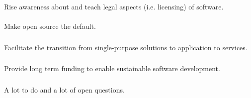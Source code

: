 \documentclass{beamer}
\begin{document}
\begin{frame}
  \frametitle{}
  \begin{block}{}
    \begin{center}
      Rise awareness about and teach legal aspects (i.e. licensing) of
      software.\\\ \\Make open source the default.
    \end{center}
  \end{block}
\end{frame}

\begin{frame}
  \frametitle{}
  \begin{block}{}
    \begin{center}
       Facilitate the transition from single-purpose solutions to
       application to services.
    \end{center}
  \end{block}
\end{frame}

\begin{frame}
  \frametitle{}
  \begin{block}{}
    \begin{center}
      Provide long term funding to enable sustainable software
      development.
    \end{center}
  \end{block}
\end{frame}

\begin{frame}
  \frametitle{}
  \begin{block}{}
    \begin{center}
      A lot to do and a lot of open questions.
    \end{center}
  \end{block}
\end{frame}


\end{document}
